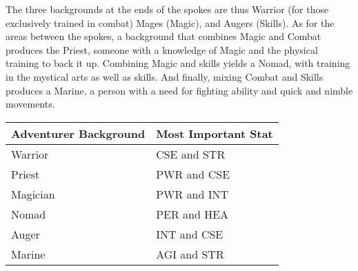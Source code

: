 \begin{multicols*}{2}
\begin{center}
\end{center}

The three backgrounds at the ends of the spokes are thus Warrior (for those exclusively trained in combat) Mages (Magic), and Augers (Skills). As for the areas between the spokes, a background that combines Magic and Combat produces the Priest, someone with a knowledge of Magic and the physical training to back it up. Combining Magic and skills yields a Nomad, with training in the mystical arts as well as skills. And finally, mixing Combat and Skills produces a Marine, a person with a need for fighting ability and quick and nimble movements.

\begin{tcolorbox}[breakable,boxrule=0pt,title=\textbf{Adventurer Background Stats}]
\begin{tabular}{@{}l l}
\textbf{Adventurer Background} & \textbf{Most Important Stat}\\
\midrule
Warrior & CSE and STR\\
Priest &  PWR and CSE\\
Magician &  PWR and INT\\
Nomad &  PER and HEA\\
Auger &  INT and CSE\\
Marine &  AGI and STR
\end{tabular}
\end{tcolorbox}


\end{multicols*}
